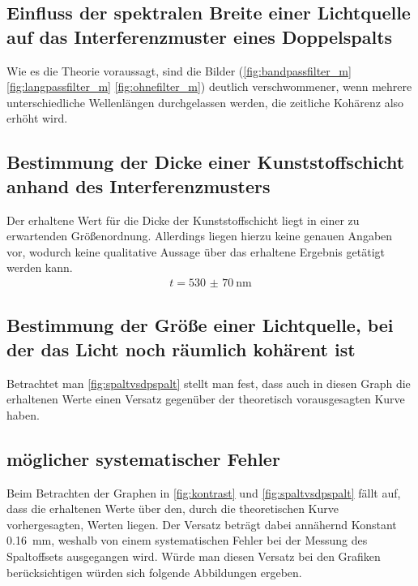 \documentclass[11pt,ngerman]{scrartcl}
\begin{document}
\subsection{Einfluss der spektralen Breite einer Lichtquelle auf das Interferenzmuster eines Doppelspalts}

Wie es die Theorie voraussagt, sind die Bilder (\ref{fig:bandpassfilter_m}
\ref{fig:langpassfilter_m} \ref{fig:ohnefilter_m}) deutlich verschwommener, wenn
mehrere unterschiedliche Wellenlängen durchgelassen werden, die zeitliche
Kohärenz also erhöht wird.

\subsection{Bestimmung der Dicke einer Kunststoffschicht anhand des Interferenzmusters}

Der erhaltene Wert für die Dicke der Kunststoffschicht liegt in einer zu
erwartenden Größenordnung. Allerdings liegen hierzu keine genauen Angaben vor,
wodurch keine qualitative Aussage über das erhaltene Ergebnis getätigt werden
kann.
\begin{align*}
	t = \SI{530(70)}{\nm}
\end{align*}

\subsection{Bestimmung der Größe einer Lichtquelle, bei der das Licht noch räumlich kohärent ist}

Betrachtet man \autoref{fig:spaltvsdpspalt} stellt man fest, dass auch in
diesen Graph die erhaltenen Werte einen Versatz gegenüber der theoretisch
vorausgesagten Kurve haben.

\subsection{möglicher systematischer Fehler}

Beim Betrachten der Graphen in  \autoref{fig:kontrast} und
\autoref{fig:spaltvsdpspalt} fällt auf, dass die erhaltenen Werte über den,
durch die theoretischen Kurve vorhergesagten, Werten liegen. Der Versatz
beträgt dabei annähernd Konstant \SI{0.16}{mm}, weshalb von einem
systematischen Fehler bei der Messung des Spaltoffsets ausgegangen wird. Würde
man diesen Versatz bei den Grafiken berücksichtigen würden sich folgende
Abbildungen ergeben.
\end{document}
